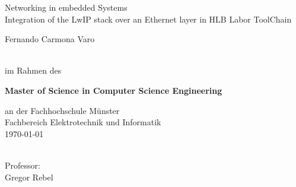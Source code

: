 %



 \begin{titlepage}

 \begin{figure}[htbp]
 \end{figure}



\vspace{1 cm}
\center

\Huge{\textsf{Networking in embedded Systems}}
\vspace{0.5cm}
\large{\\Integration of the LwIP stack over an Ethernet layer in HLB Labor ToolChain}
\vspace{2em}

\Large{
    \textsf{
        Fernando Carmona Varo\\
        }
    }
 \Large{ 
   \textsf{
     \\ im Rahmen des } 
   \vspace{1em}
         
      
         
   \textbf{Master of Science in Computer Science Engineering}
         
   \vspace{2em}
   \textsf{an der Fachhochschule Münster\\Fachbereich Elektrotechnik
     und Informatik\\ \today }
 }
 \vspace{4em}
 \Large{
 	\textsf{
          \\Professor:  \\
         Gregor Rebel
       }
     }

 \end{titlepage}
